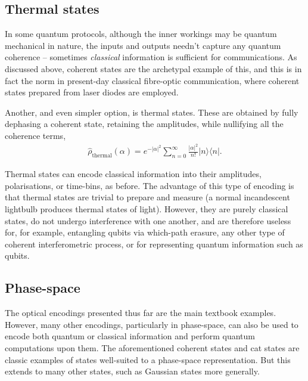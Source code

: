 \documentclass[aps, rmp, twocolumn, amsmath, amssymb, nofootinbib, superscriptaddress, longbibliography, floatfix, table-of-contents, eqsecnum]{revtex4-1}
\newcommand{\bra}[1]{\langle#1|}
\newcommand{\ket}[1]{|#1\rangle}
\begin{document}
%
%

\subsection{Thermal states} \label{sec:thermal_states}

In some quantum protocols, although the inner workings may be quantum mechanical in nature, the inputs and outputs needn't capture any quantum coherence -- sometimes \textit{classical} information is sufficient for communications. As discussed above, coherent states are the archetypal example of this, and this is in fact the norm in present-day classical fibre-optic communication, where coherent states prepared from laser diodes are employed.

Another, and even simpler option, is thermal states. These are obtained by fully dephasing a coherent state, retaining the amplitudes, while nullifying all the coherence terms,
\begin{align}
\hat\rho_\text{thermal}(\alpha) = e^{-|\alpha|^2} \sum_{n=0}^\infty \frac{|\alpha|^2}{n!}\ket{n}\bra{n}.
\end{align}

Thermal states can encode classical information into their amplitudes, polarisations, or time-bins, as before. The advantage of this type of encoding is that thermal states are trivial to prepare and measure (a normal incandescent lightbulb produces thermal states of light). However, they are purely classical states, do not undergo interference with one another, and are therefore useless for, for example, entangling qubits via which-path erasure, any other type of coherent interferometric process, or for representing quantum information such as qubits.

%
%

\subsection{Phase-space} \label{sec:exotic} 

The optical encodings presented thus far are the main textbook examples. However, many other encodings, particularly in phase-space, can also be used to encode both quantum or classical information and perform quantum computations upon them. The aforementioned coherent states and cat states are classic examples of states well-suited to a phase-space representation. But this extends to many other states, such as Gaussian states more generally.
\end{document}
